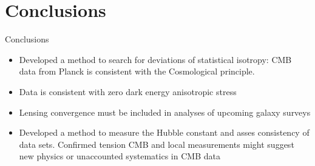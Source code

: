 \documentclass{beamer}
\begin{document}

\section{Conclusions}

\begin{frame}{Conclusions}
\begin{itemize}
\item Developed a method to search for deviations of statistical isotropy: CMB data from Planck is consistent with the Cosmological principle. 
\item Data is consistent with zero dark energy anisotropic stress
\item Lensing convergence must be included in analyses of upcoming galaxy surveys
\item Developed a method to measure the Hubble constant and asses consistency of data sets. Confirmed tension CMB and local measurements might suggest new physics or unaccounted systematics in CMB data    
\end{itemize}
\end{frame}
\end{document}
